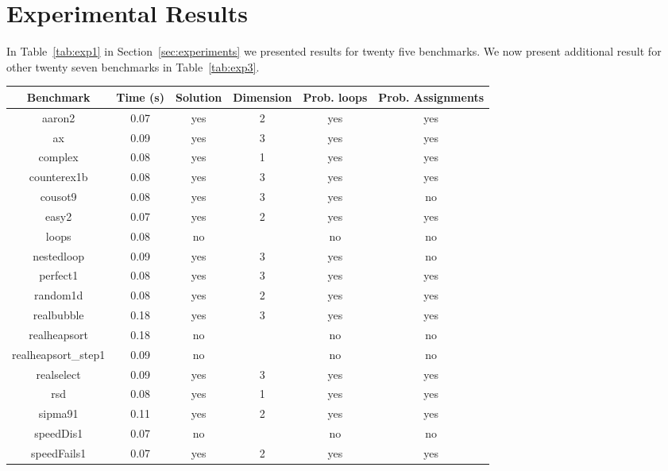 
\section{Experimental Results}\label{sec:app_ex}
In Table~\ref{tab:exp1} in Section~\ref{sec:experiments} we presented results for twenty five benchmarks.
We now present additional result for other twenty seven benchmarks in Table~\ref{tab:exp3}.



\begin{center}
\begin{table}[]
  \centering
   \begin{tabular}{c|c|c|c|c|c}
    
   {Benchmark} & {Time (s)} & {Solution} & {Dimension} & {Prob. loops} & {Prob. Assignments
} \\\hline
{aaron2} & {0.07} & {yes} & {2} & {yes} & {yes} \\\hline
{ax} & {0.09} & {yes} & {3} & {yes} & {yes} \\\hline
{complex} & {0.08} & {yes} & {1} & {yes} & {yes} \\\hline
{counterex1b} & {0.08} & {yes} & {3} & {yes} & {yes} \\\hline
{cousot9} & {0.08} & {yes} & {3} & {yes} & {no} \\\hline
{easy2} & {0.07} & {yes} & {2} & {yes} & {yes} \\\hline
{loops} & {0.08} & {no} & {} & {no} & {no} \\\hline
{nestedloop} & {0.09} & {yes} & {3} & {yes} & {no} \\\hline
{perfect1} & {0.08} & {yes} & {3} & {yes} & {yes} \\\hline
{random1d} & {0.08} & {yes} & {2} & {yes} & {yes} \\\hline
{realbubble} & {0.18} & {yes} & {3} & {yes} & {yes} \\\hline
{realheapsort} & {0.18} & {no} & {} & {no} & {no} \\\hline
{realheapsort\_step1} & {0.09} & {no} & {} & {no} & {no} \\\hline
{realselect} & {0.09} & {yes} & {3} & {yes} & {yes} \\\hline
{rsd} & {0.08} & {yes} & {1} & {yes} & {yes} \\\hline
{sipma91} & {0.11} & {yes} & {2} & {yes} & {yes} \\\hline
{speedDis1} & {0.07} & {no} & {} & {no} & {no} \\\hline
{speedFails1} & {0.07} & {yes} & {2} & {yes} & {yes} \\\hline

\end{tabular}
\end{table}
\end{center}

